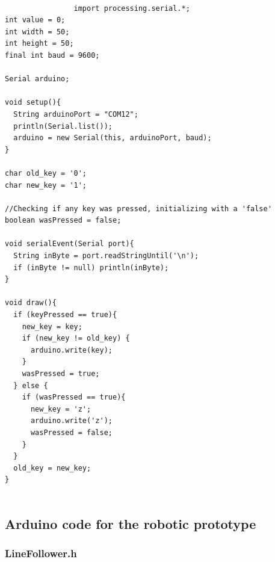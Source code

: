 \documentclass[14pt,a4paper]{extarticle}
\begin{document}
		\begin{verbatim}
		
				import processing.serial.*;
int value = 0;
int width = 50;
int height = 50;
final int baud = 9600;

Serial arduino;

void setup(){
  String arduinoPort = "COM12";
  println(Serial.list());
  arduino = new Serial(this, arduinoPort, baud);
}

char old_key = '0';
char new_key = '1';

//Checking if any key was pressed, initializing with a 'false'
boolean wasPressed = false;

void serialEvent(Serial port){
  String inByte = port.readStringUntil('\n');
  if (inByte != null) println(inByte);
}

void draw(){
  if (keyPressed == true){
    new_key = key;
    if (new_key != old_key) {
      arduino.write(key);
    }
    wasPressed = true;
  } else {
    if (wasPressed == true){
      new_key = 'z';
      arduino.write('z');
      wasPressed = false;
    }
  }
  old_key = new_key;
}
		
		\end{verbatim}

	\subsection{Arduino code for the robotic prototype}
	
	\subsubsection{LineFollower.h}
	
\end{document}
